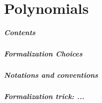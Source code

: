 \chapter{Polynomials}


\paragraph{Contents}

\paragraph{Formalization Choices}

\paragraph{Notations and conventions}

\paragraph{Formalization trick: ...}
